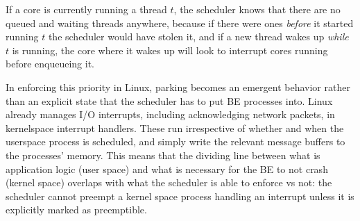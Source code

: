 If a core is currently running a \beclass{} thread $t$, the scheduler knows that
there are no queued and waiting \normalclass{} threads anywhere, because if
there were ones \textit{before} it started running $t$ the scheduler would have
stolen it, and if a new \normalclass{} thread wakes up \textit{while} $t$ is
running, the core where it wakes up will look to interrupt cores running
\beclass{} before enqueueing it.

In enforcing this priority in Linux, parking becomes an emergent behavior rather
than an explicit state that the scheduler has to put BE processes into. Linux
already manages I/O interrupts, including acknowledging network packets, in
kernelspace interrupt handlers. These run irrespective of whether and when the
userspace process is scheduled, and simply write the relevant message buffers to
the processes' memory. This means that the dividing line between what is
application logic (user space) and what is necessary for the BE to not crash
(kernel space) overlaps with what the scheduler is able to enforce vs not: the
scheduler cannot preempt a kernel space process handling an interrupt unless it
is explicitly marked as preemptible.
